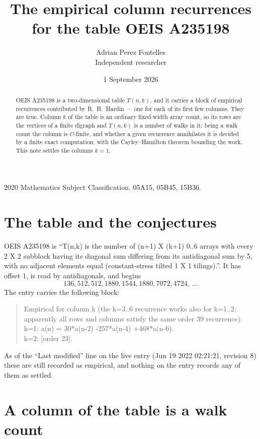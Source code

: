 \documentclass[11pt,a4paper]{article}
\title{The empirical column recurrences for the table OEIS A235198}
\author{Adrian Perez Fontelles\\ \small Independent researcher}
\date{1 September 2026}
\theoremstyle{plain}
\theoremstyle{definition}
\begin{document}
\maketitle

\begin{abstract}
OEIS A235198 is a two-dimensional table $T(n,k)$, and it carries a block of empirical
recurrences contributed by R.~H.~Hardin --- one for each of its first few columns. They are
true. Column $k$ of the table is an ordinary fixed-width array count, so its rows are the
vertices of a finite digraph and $T(n,k)$ is a number of walks in it; being a walk count the
column is $C$-finite, and whether a given recurrence annihilates it is decided by a finite
exact computation, with the Cayley--Hamilton theorem bounding the work. This note settles the columns $k=1$.
\end{abstract}

\noindent\small 2020 Mathematics Subject Classification. 05A15, 05B45, 15B36.\normalsize

\section{The table and the conjectures}

OEIS A235198 is ``T(n,k) is the number of (n+1) X (k+1) 0..6 arrays with every 2 X 2 subblock having its diagonal sum differing from its antidiagonal sum by 5, with no adjacent elements equal (constant-stress tilted 1 X 1 tilings).''. It has offset $1$, is
read by antidiagonals, and begins
\[
136, 512, 512, 1880, 1544, 1880, 7072, 4724,\ \dots
\]
The entry carries the following block:
\begin{quote}\small
Empirical for column k (the k=3..6 recurrence works also for k=1..2; apparently all rows and columns satisfy the same order 39 recurrence):\\
k=1: a(n) = 30*a(n-2) -257*a(n-4) +468*a(n-6).\\
k=2: [order 23].\\
\end{quote}
As of the ``Last modified'' line on the live entry (Jun 19 2022 02:21:21, revision 8) these are still
recorded as empirical, and nothing on the entry records any of them as settled.

\section{A column of the table is a walk count}
\end{document}
